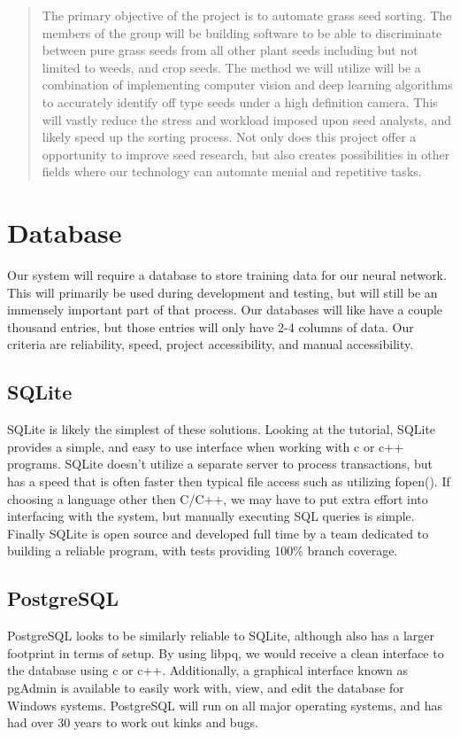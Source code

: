 \documentclass[onecolumn, draftclsnofoot,10pt, compsoc]{IEEEtran}
\begin{document}
\begin{titlepage}
\begin{singlespace}
\begin{abstract}
        	The primary objective of the project is to automate grass seed sorting. The members of the group will be building software to be able to discriminate between pure grass seeds from all other plant seeds including but not limited to weeds, and crop seeds. The method we will utilize will be a combination of implementing computer vision and deep learning algorithms to accurately identify off type seeds under a high definition camera. This will vastly reduce the stress and workload imposed upon seed analysts, and likely speed up the sorting process. Not only does this project offer a opportunity to improve seed research, but also creates possibilities in other fields where our technology can automate menial and repetitive tasks.
        \end{abstract}     
    \end{singlespace}
\end{titlepage}
\newpage
{}
\tableofcontents
\clearpage

\section{Database}
Our system will require a database to store training data for our neural network. This will primarily  be used during development and testing, but will still be an immensely important part of that process. Our databases will like have a couple thousand entries, but those entries will only have 2-4 columns of data. Our criteria are reliability, speed, project accessibility, and manual accessibility. 
\subsection{SQLite}
SQLite is likely the simplest of these solutions. Looking at the tutorial, SQLite provides a simple, and easy to use interface when working with c or c++ programs.\cite{sqlite} SQLite doesn't utilize a separate server to process transactions, but has a speed that is often faster then typical file access such as utilizing fopen().\cite{sqlite} If choosing a language other then C/C++, we may have to put extra effort into interfacing with the system, but manually executing SQL queries is simple. Finally SQLite is open source and developed full time by a team dedicated to building a reliable program, with tests providing 100\% branch coverage.\cite{sqlite}
\subsection{PostgreSQL}
PostgreSQL looks to be similarly reliable to SQLite, although also has a larger footprint in terms of setup. By using libpq, we would receive a clean interface to the database using c or c++. \cite{libpq} Additionally, a graphical interface known as pgAdmin is available to easily work with, view, and edit the database for Windows systems. \cite{pgadmin} PostgreSQL will run on all major operating systems, and has had over 30 years to work out kinks and bugs. \cite{postgres}
\end{document}
